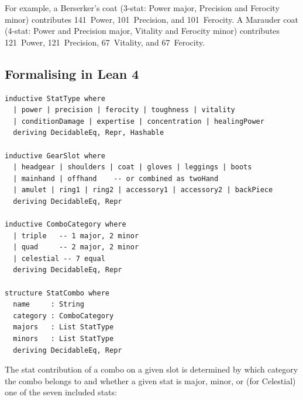 \documentclass[11pt, a4paper, oneside]{book}
\begin{document}
For example, a Berserker's coat (3-stat: Power major, Precision and Ferocity
minor) contributes 141~Power, 101~Precision, and 101~Ferocity.  A Marauder coat
(4-stat: Power and Precision major, Vitality and Ferocity minor) contributes
121~Power, 121~Precision, 67~Vitality, and 67~Ferocity.

\subsection{Formalising in Lean 4}

\begin{leanbox}[title={Lean 4 --- Core Data Model}]
\begin{verbatim}
inductive StatType where
  | power | precision | ferocity | toughness | vitality
  | conditionDamage | expertise | concentration | healingPower
  deriving DecidableEq, Repr, Hashable

inductive GearSlot where
  | headgear | shoulders | coat | gloves | leggings | boots
  | mainhand | offhand    -- or combined as twoHand
  | amulet | ring1 | ring2 | accessory1 | accessory2 | backPiece
  deriving DecidableEq, Repr

inductive ComboCategory where
  | triple   -- 1 major, 2 minor
  | quad     -- 2 major, 2 minor
  | celestial -- 7 equal
  deriving DecidableEq, Repr

structure StatCombo where
  name     : String
  category : ComboCategory
  majors   : List StatType
  minors   : List StatType
  deriving DecidableEq, Repr
\end{verbatim}
\end{leanbox}

The stat contribution of a combo on a given slot is determined by which
category the combo belongs to and whether a given stat is major, minor, or
(for Celestial) one of the seven included stats:
\end{document}
